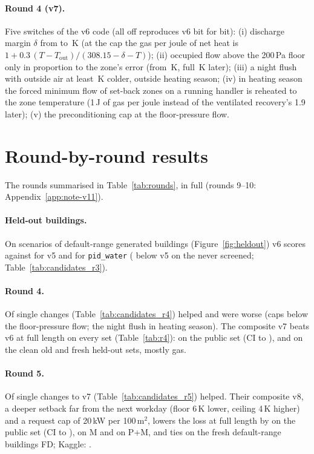 \documentclass{article}
\begin{document}
\paragraph{Round 4 (v7).}
\label{sec:v7}
Five switches of the v6 code (all off reproduces v6 bit for bit): (i) discharge margin $\delta$ from
\VSixDischMargin{} to \ParRFDischMargin\,K (at the cap the gas per joule of net heat is
$1 + 0.3\,(T - T_{\text{out}})/(308.15 - \delta - T)$); (ii) occupied flow above the 200\,Pa floor only in
proportion to the zone's error (from \ParRFOccEzero\,K, full \ParRFOccSpan\,K later); (iii) a night flush with
outside air at least \ParRFFlushDt\,K colder, outside heating season; (iv) in heating season the forced minimum
flow of set-back zones on a running handler is reheated to the zone temperature (1\,J of gas per joule instead
of the ventilated recovery's 1.9 later); (v) the preconditioning cap at the floor-pressure flow.

\section{Round-by-round results}
\label{app:rounds}
The rounds summarised in Table~\ref{tab:rounds}, in full (rounds 9--10: Appendix~\ref{app:note-v11}).

\paragraph{Held-out buildings.}
On \NHeldAll{} scenarios of \NHeldAllBuild{} default-range generated buildings (Figure~\ref{fig:heldout}) v6 scores
\HeldAllMetricOurs{} against \HeldAllMetricOursVFive{} for v5 and \HeldAllMetricPidWater{} for \texttt{pid\_water}
(\HeldUnscrVFiveRelRed{} below v5 on the \NHeldUnscr{} never screened; Table~\ref{tab:candidates_r3}).

\paragraph{Round 4.}
Of \RFNSingles{} single changes (Table~\ref{tab:candidates_r4}) \RFNHelps{} helped and \RFNWorse{} were worse (caps
below the floor-pressure flow; the night flush in heating season). The composite v7 beats v6 at full length on every
set (Table~\ref{tab:r4}): \RFConfPubRed{} on the public set (CI \RFConfPubRedLo{} to \RFConfPubRedHi),
\RFConfOldCleanRed{} and \RFConfFreshRed{} on the clean old and fresh held-out sets, mostly gas.

\paragraph{Round 5.}
Of \RFiveNSingles{} single changes to v7 (Table~\ref{tab:candidates_r5}) \RFiveNHelps{} helped. Their composite v8, a
deeper setback far from the next workday (floor 6\,K lower, ceiling 4\,K higher) and a request cap of 20\,kW per
100\,m$^2$, lowers the loss at full length by
\RFiveConfPubRelAbs{} on the public set (CI \RFiveConfPubRelHiAbs{} to \RFiveConfPubRelLoAbs), \RFiveConfMinnRelAbs{} on
M and \RFiveConfPubMinnRelAbs{} on P+M, and ties on the fresh default-range buildings FD; Kaggle: \RFiveKagVEight.
\end{document}
